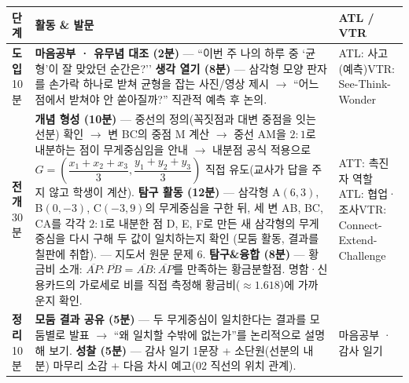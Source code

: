 \documentclass[11pt,a4paper]{article}
\begin{document}
\begin{tabularx}{\linewidth}{@{}>{\centering\arraybackslash}p{1.6cm}X>{\raggedright\arraybackslash\small}p{3.1cm}@{}}
\toprule
\textbf{단계} & \textbf{활동 \& 발문} & \textbf{ATL / VTR} \\
\midrule
\textcolor{goldstrong}{\textbf{도입}}\newline\footnotesize 10분 &
\textbf{마음공부 · 유무념 대조 (2분)} --- ``이번 주 나의 하루 중 `균형'이 잘 맞았던 순간은?''\newline
\textbf{생각 열기 (8분)} --- 삼각형 모양 판자를 손가락 하나로 받쳐 균형을 잡는 사진/영상 제시 $\to$ ``어느 점에서 받쳐야 안 쏟아질까?'' 직관적 예측 후 논의. &
ATL: 사고(예측)\newline VTR: See-Think-Wonder \\
\addlinespace
\textcolor{goldstrong}{\textbf{전개}}\newline\footnotesize 30분 &
\textbf{개념 형성 (10분)} --- 중선의 정의(꼭짓점과 대변 중점을 잇는 선분) 확인 $\to$ 변 BC의 중점 M 계산 $\to$ 중선 AM을 $2:1$로 내분하는 점이 무게중심임을 안내 $\to$ 내분점 공식 적용으로 $G=\left(\dfrac{x_1+x_2+x_3}{3},\dfrac{y_1+y_2+y_3}{3}\right)$ 직접 유도(교사가 답을 주지 않고 학생이 계산).\newline
\textbf{탐구 활동 (12분)} --- 삼각형 A$(6,3)$, B$(0,-3)$, C$(-3,9)$의 무게중심을 구한 뒤, 세 변 AB, BC, CA를 각각 $2:1$로 내분한 점 D, E, F로 만든 새 삼각형의 무게중심을 다시 구해 두 값이 일치하는지 확인 (모둠 활동, 결과를 칠판에 취합). --- 지도서 원문 문제 6.\newline
\textbf{탐구\&융합 (8분)} --- 황금비 소개: $\overline{AP}:\overline{PB}=\overline{AB}:\overline{AP}$를 만족하는 황금분할점. 명함·신용카드의 가로세로 비를 직접 측정해 황금비($\approx 1.618$)에 가까운지 확인. &
ATT: 촉진자 역할\newline ATL: 협업·조사\newline VTR: Connect-Extend-Challenge \\
\addlinespace
\textcolor{goldstrong}{\textbf{정리}}\newline\footnotesize 10분 &
\textbf{모둠 결과 공유 (5분)} --- 두 무게중심이 일치한다는 결과를 모둠별로 발표 $\to$ ``왜 일치할 수밖에 없는가''를 논리적으로 설명해 보기.\newline
\textbf{성찰 (5분)} --- 감사 일기 1문장 + 소단원(선분의 내분) 마무리 소감 + 다음 차시 예고(02 직선의 위치 관계). &
마음공부 · 감사 일기 \\
\bottomrule
\end{tabularx}
\end{document}
